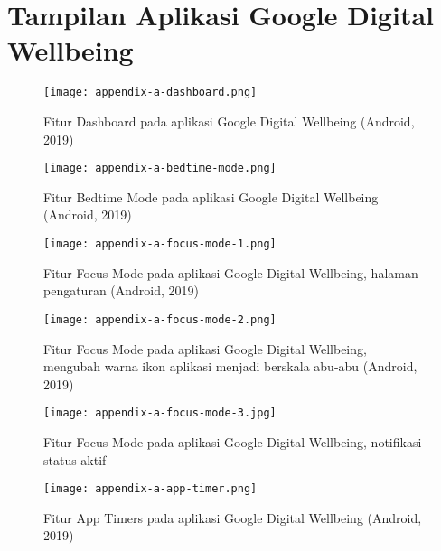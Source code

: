 \chapter{Tampilan Aplikasi Google Digital Wellbeing}
\label{chpt:gambar_dw}

\begin{figure}[h]
  \centering
  \texttt{[image: appendix-a-dashboard.png]}
  \caption{Fitur Dashboard pada aplikasi Google Digital Wellbeing (Android, 2019)}
\end{figure}

\begin{figure}[h]
  \centering
  \texttt{[image: appendix-a-bedtime-mode.png]}
  \caption{Fitur Bedtime Mode pada aplikasi Google Digital Wellbeing (Android, 2019)}
\end{figure}

\begin{figure}[h]
  \centering
  \texttt{[image: appendix-a-focus-mode-1.png]}
  \caption{Fitur Focus Mode pada aplikasi Google Digital Wellbeing, halaman pengaturan (Android, 2019)}
\end{figure}

\begin{figure}[h]
  \centering
  \texttt{[image: appendix-a-focus-mode-2.png]}
  \caption{Fitur Focus Mode pada aplikasi Google Digital Wellbeing, mengubah warna ikon aplikasi menjadi berskala abu-abu (Android, 2019)}
\end{figure}

\begin{figure}[h]
  \centering
  \texttt{[image: appendix-a-focus-mode-3.jpg]}
  \caption{Fitur Focus Mode pada aplikasi Google Digital Wellbeing, notifikasi status aktif}
\end{figure}

\begin{figure}[h]
  \centering
  \texttt{[image: appendix-a-app-timer.png]}
  \caption{Fitur App Timers pada aplikasi Google Digital Wellbeing (Android, 2019)}
\end{figure}
